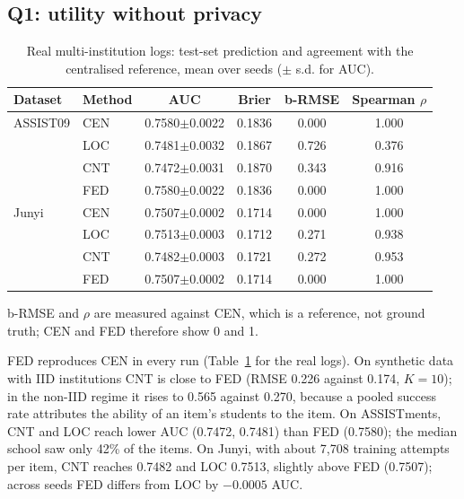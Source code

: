 \documentclass[pdflatex,iicol,sn-mathphys-num]{sn-jnl}
\theoremstyle{thmstyleone}
\newenvironment{widetable}{\begin{table}[t]}{\end{table}}
\newcommand{\AssistCNTAuc}{0.7472}
\newcommand{\AssistCovMedian}{42}
\newcommand{\AssistFEDAuc}{0.7580}
\newcommand{\AssistLOCAuc}{0.7481}
\newcommand{\GJunyiFedLocDiff}{$-0.0005$}
\newcommand{\JunyiCNTAuc}{0.7482}
\newcommand{\JunyiFEDAuc}{0.7507}
\newcommand{\JunyiLOCAuc}{0.7513}
\newcommand{\JunyiRespPerItem}{7,708}
\newcommand{\SynTenIidCNTRmse}{0.226}
\newcommand{\SynTenIidFEDRmse}{0.174}
\newcommand{\SynTenNonCNTRmse}{0.565}
\newcommand{\SynTenNonFEDRmse}{0.270}
\begin{document}
\subsection{Q1: utility without privacy}\label{sec:eval-utility}

\begin{widetable}
\centering
\caption{Real multi-institution logs: test-set prediction and agreement with the centralised reference, mean over seeds ($\pm$ s.d. for AUC).}
\label{tab:real}
\small
\begin{tabular}{llcccc}
\toprule
Dataset & Method & AUC & Brier & b-RMSE & Spearman $\rho$ \\
\midrule
ASSIST09 & CEN & 0.7580$\pm$0.0022 & 0.1836 & 0.000 & 1.000 \\
 & LOC & 0.7481$\pm$0.0032 & 0.1867 & 0.726 & 0.376 \\
 & CNT & 0.7472$\pm$0.0031 & 0.1870 & 0.343 & 0.916 \\
 & FED & 0.7580$\pm$0.0022 & 0.1836 & 0.000 & 1.000 \\
\midrule
Junyi & CEN & 0.7507$\pm$0.0002 & 0.1714 & 0.000 & 1.000 \\
 & LOC & 0.7513$\pm$0.0003 & 0.1712 & 0.271 & 0.938 \\
 & CNT & 0.7482$\pm$0.0003 & 0.1721 & 0.272 & 0.953 \\
 & FED & 0.7507$\pm$0.0002 & 0.1714 & 0.000 & 1.000 \\
\bottomrule
\end{tabular}
\par\smallskip\footnotesize b-RMSE and $\rho$ are measured against CEN, which is a reference, not ground truth; CEN and FED therefore show 0 and 1.
\end{widetable}

FED reproduces CEN in every run (Table~\ref{tab:real} for the real logs). On synthetic data with IID institutions CNT is close to FED (RMSE \SynTenIidCNTRmse{} against \SynTenIidFEDRmse{}, $K=10$); in the non-IID regime it rises to \SynTenNonCNTRmse{} against \SynTenNonFEDRmse{}, because a pooled success rate attributes the ability of an item's students to the item. On ASSISTments, CNT and LOC reach lower AUC (\AssistCNTAuc{}, \AssistLOCAuc{}) than FED (\AssistFEDAuc{}); the median school saw only \AssistCovMedian\% of the items. On Junyi, with about \JunyiRespPerItem{} training attempts per item, CNT reaches \JunyiCNTAuc{} and LOC \JunyiLOCAuc{}, slightly above FED (\JunyiFEDAuc{}); across seeds FED differs from LOC by \GJunyiFedLocDiff{} AUC.
\end{document}
